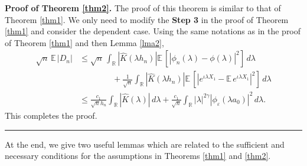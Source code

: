 \documentclass[11pt]{article}
\newenvironment{proof}[1][Proof]{\textbf{#1.} }{\
\rule{0.5em}{0.5em}}
\def\R{{\mathbb R}}
\def\E{{{\mathbb E}\,}}
\begin{document}
\bigskip

\noindent
\begin{proof}[Proof of Theorem \ref{thm2}] The proof of this theorem is similar to that of Theorem \ref{thm1}. We only need to modify the \textbf{Step 3} in the proof of Theorem \ref{thm1} and consider the dependent case. Using the same notations as in the proof of Theorem \ref{thm1} and then Lemma \ref{lma2}, 
\begin{align*} 
\sqrt{n}\, \E |D_n|
&\leq \sqrt{n}\, \int_{\R} |\widehat{K}(\lambda h_n)| \E\left[|\phi_n(\lambda)-\phi(\lambda)|^2\right] \, d\lambda \\
&\qquad\qquad +\frac{1}{\sqrt{n}}\int_{\R} |\widehat{K}(\lambda h_n)|\E\left[|e^{\iota \lambda  X_1}-\E e^{\iota \lambda  X_1}|^2\right] \, d\lambda \\
&\leq \frac{c_1}{\sqrt{n}h_n}\int_{\R} |\widehat{K}(\lambda )|\, d\lambda+\frac{c_1}{\sqrt{n}}\int_{\R} |\lambda|^{2\gamma} |\phi_{\varepsilon}(\lambda a_0)|^2\, d\lambda.
\end{align*}
This completes the proof.
\end{proof}

\bigskip


At the end, we give two useful lemmas which are related to the sufficient and necessary conditions for the assumptions in Theorems \ref{thm1} and \ref{thm2}.
\end{document}
